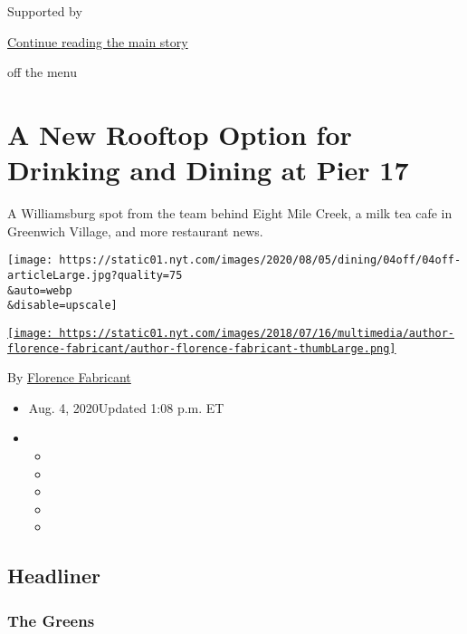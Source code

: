 Supported by

\protect\hyperlink{after-sponsor}{Continue reading the main story}

off the menu

\hypertarget{a-new-rooftop-option-for-drinking-and-dining-at-pier-17}{%
\section{A New Rooftop Option for Drinking and Dining at Pier
17}\label{a-new-rooftop-option-for-drinking-and-dining-at-pier-17}}

A Williamsburg spot from the team behind Eight Mile Creek, a milk tea
cafe in Greenwich Village, and more restaurant news.

\texttt{[image: https://static01.nyt.com/images/2020/08/05/dining/04off/04off-articleLarge.jpg?quality=75\\\&auto=webp\\\&disable=upscale]}

\href{https://www.nytimes.com/by/florence-fabricant}{\texttt{[image: https://static01.nyt.com/images/2018/07/16/multimedia/author-florence-fabricant/author-florence-fabricant-thumbLarge.png]}}

By \href{https://www.nytimes.com/by/florence-fabricant}{Florence
Fabricant}

\begin{itemize}
\item
  Aug. 4, 2020Updated 1:08 p.m. ET
\item
  \begin{itemize}
  \item
  \item
  \item
  \item
  \item
  \end{itemize}
\end{itemize}

\hypertarget{headliner}{%
\subsection{Headliner}\label{headliner}}

\hypertarget{the-greens}{%
\subsubsection{The Greens}\label{the-greens}}

